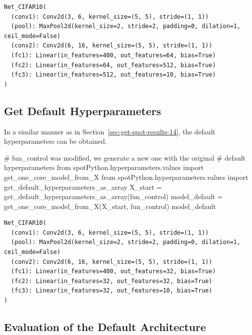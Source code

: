 \documentclass[
  letterpaper,
  DIV=11,
  numbers=noendperiod]{scrreprt}
\newenvironment{Shaded}{\begin{snugshade}}{\end{snugshade}}
\newcommand{\CommentTok}[1]{\textcolor[rgb]{0.37,0.37,0.37}{#1}}
\newcommand{\ImportTok}[1]{\textcolor[rgb]{0.00,0.46,0.62}{#1}}
\newcommand{\NormalTok}[1]{\textcolor[rgb]{0.00,0.23,0.31}{#1}}
\newcommand{\OperatorTok}[1]{\textcolor[rgb]{0.37,0.37,0.37}{#1}}
\begin{document}
\begin{verbatim}
Net_CIFAR10(
  (conv1): Conv2d(3, 6, kernel_size=(5, 5), stride=(1, 1))
  (pool): MaxPool2d(kernel_size=2, stride=2, padding=0, dilation=1, ceil_mode=False)
  (conv2): Conv2d(6, 16, kernel_size=(5, 5), stride=(1, 1))
  (fc1): Linear(in_features=400, out_features=64, bias=True)
  (fc2): Linear(in_features=64, out_features=512, bias=True)
  (fc3): Linear(in_features=512, out_features=10, bias=True)
)
\end{verbatim}

\hypertarget{get-default-hyperparameters-2}{%
\subsection{Get Default
Hyperparameters}\label{get-default-hyperparameters-2}}

In a similar manner as in Section~\ref{sec-get-spot-results-14}, the
default hyperparameters can be obtained.

\begin{Shaded}
\begin{Highlighting}[]
\CommentTok{\# fun\_control was modified, we generate a new one with the original }
\CommentTok{\# default hyperparameters}
\ImportTok{from}\NormalTok{ spotPython.hyperparameters.values }\ImportTok{import}\NormalTok{ get\_one\_core\_model\_from\_X}
\ImportTok{from}\NormalTok{ spotPython.hyperparameters.values }\ImportTok{import}\NormalTok{ get\_default\_hyperparameters\_as\_array}
\NormalTok{X\_start }\OperatorTok{=}\NormalTok{ get\_default\_hyperparameters\_as\_array(fun\_control)}
\NormalTok{model\_default }\OperatorTok{=}\NormalTok{ get\_one\_core\_model\_from\_X(X\_start, fun\_control)}
\NormalTok{model\_default}
\end{Highlighting}
\end{Shaded}

\begin{verbatim}
Net_CIFAR10(
  (conv1): Conv2d(3, 6, kernel_size=(5, 5), stride=(1, 1))
  (pool): MaxPool2d(kernel_size=2, stride=2, padding=0, dilation=1, ceil_mode=False)
  (conv2): Conv2d(6, 16, kernel_size=(5, 5), stride=(1, 1))
  (fc1): Linear(in_features=400, out_features=32, bias=True)
  (fc2): Linear(in_features=32, out_features=32, bias=True)
  (fc3): Linear(in_features=32, out_features=10, bias=True)
)
\end{verbatim}

\hypertarget{evaluation-of-the-default-architecture}{%
\subsection{Evaluation of the Default
Architecture}\label{evaluation-of-the-default-architecture}}
\end{document}
